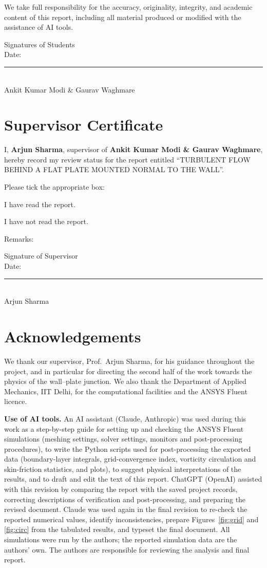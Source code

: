 \documentclass[12pt,a4paper,oneside]{report}
\newcommand{\checkbox}{\fbox{\rule{0pt}{6pt}\rule{6pt}{0pt}}\hspace{6pt}}
\begin{document}
We take full responsibility for the accuracy, originality, integrity, and academic content of this report, including all material produced or modified with the assistance of AI tools.

\vspace{30mm}
Signatures of Students\\
Date: \rule{40mm}{0.4pt}\\
Ankit Kumar Modi \& Gaurav Waghmare

\chapter*{Supervisor Certificate}
\thispagestyle{plain}
I, \textbf{Arjun Sharma}, supervisor of \textbf{Ankit Kumar Modi \& Gaurav Waghmare}, hereby record my review status for the report entitled ``TURBULENT FLOW BEHIND A FLAT PLATE MOUNTED NORMAL TO THE WALL''.

Please tick the appropriate box:

\checkbox I have read the report.

\checkbox I have not read the report.

Remarks:

\vspace{40mm}
Signature of Supervisor\\
Date: \rule{40mm}{0.4pt}\\
Arjun Sharma

\chapter*{Acknowledgements}
\thispagestyle{plain}
We thank our supervisor, Prof.\ Arjun Sharma, for his guidance throughout the project, and in particular for directing the second half of the work towards the physics of the wall--plate junction. We also thank the Department of Applied Mechanics, IIT Delhi, for the computational facilities and the ANSYS Fluent licence.

\textbf{Use of AI tools.} An AI assistant (Claude, Anthropic) was used during this work as a step-by-step guide for setting up and checking the ANSYS Fluent simulations (meshing settings, solver settings, monitors and post-processing procedures), to write the Python scripts used for post-processing the exported data (boundary-layer integrals, grid-convergence index, vorticity circulation and skin-friction statistics, and plots), to suggest physical interpretations of the results, and to draft and edit the text of this report. ChatGPT (OpenAI) assisted with this revision by comparing the report with the saved project records, correcting descriptions of verification and post-processing, and preparing the revised document. Claude was used again in the final revision to re-check the reported numerical values, identify inconsistencies, prepare Figures~\ref{fig:grid} and \ref{fig:circ} from the tabulated results, and typeset the final document. All simulations were run by the authors; the reported simulation data are the authors' own. The authors are responsible for reviewing the analysis and final report.
\end{document}
